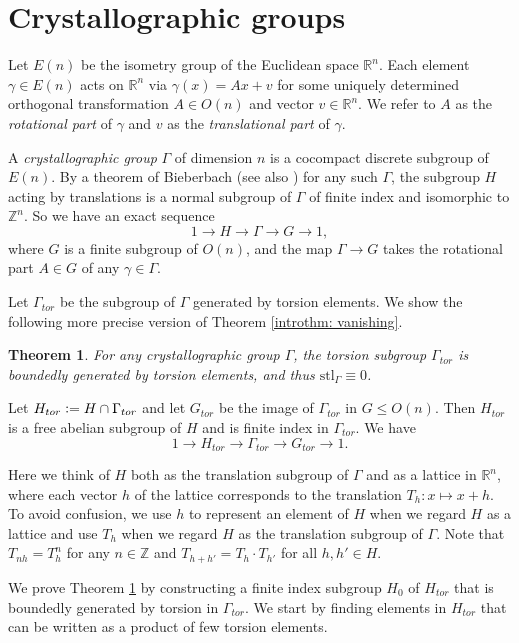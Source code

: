 \documentclass{amsart}
\newtheorem{theorem}{Theorem}[section]
\theoremstyle{definition}
\numberwithin{equation}{section}
\theoremstyle{theorem}
\theoremstyle{remark}
\def\Z{\mathbb Z}
\def\R{\mathbb R}
\def\stl{\mathrm{stl}}
\def\Gt{G_{tor}}
\def\Ht{H_{tor}}
\def\Gat{\Gamma_{tor}}
\def\defeq{\vcentcolon=}
\begin{document}
	\section{Crystallographic groups}\label{sec: crystallographic}
	Let $E(n)$ be the isometry group of the Euclidean space $\R^n$. 
	Each element $\gamma\in E(n)$ acts on $\R^n$ via $\gamma(x)=Ax+v$ for some uniquely determined orthogonal transformation $A\in O(n)$ and vector $v\in\R^n$. 
	We refer to $A$ as the \emph{rotational part} of $\gamma$ and $v$ as the \emph{translational part} of $\gamma$.
	
	A \emph{crystallographic group} $\Gamma$ of dimension $n$ is a cocompact discrete subgroup of $E(n)$. 
	By a theorem of Bieberbach \cite{Bieberbach1912} (see also \cite{Crystbook})
	for any such $\Gamma$, the subgroup $H$ acting by translations is a normal subgroup of $\Gamma$ of finite index and isomorphic to $\Z^n$.
	So we have an exact sequence
	$$1\longrightarrow H \longrightarrow \Gamma \longrightarrow G \longrightarrow 1,$$
	where $G$ is a finite subgroup of $O(n)$, and the map $\Gamma\to G$ takes the rotational part $A\in G$ of any $\gamma\in\Gamma$.
	
	Let $\Gat$ be the subgroup of $\Gamma$ generated by torsion elements.
	We show the following more precise version of Theorem \ref{introthm: vanishing}.
	\begin{theorem}\label{thm: vanishing}
		For any crystallographic group $\Gamma$, the torsion subgroup $\Gat$ is boundedly generated by torsion elements, and thus $\stl_\Gamma\equiv0$.
	\end{theorem}
	
	Let $\Ht\defeq H\cap \Gat$ and let $\Gt$ be the image of $\Gat$ in $G\le O(n)$. Then $\Ht$ is a free abelian subgroup of $H$ and is finite index in $\Gat$. We have
	$$1\longrightarrow \Ht \longrightarrow \Gat \longrightarrow \Gt \longrightarrow 1.$$
	
	Here we think of $H$ both as the translation subgroup of $\Gamma$ and as a lattice in $\R^n$, where each vector $h$ of the lattice corresponds to the translation $T_h:x\mapsto x+h$. To avoid confusion, we use $h$ to represent an element of $H$ when we regard $H$ as a lattice and use $T_h$ when we regard $H$ as the translation subgroup of $\Gamma$. Note that $T_{nh}=T_h^n$ for any $n\in\Z$ and $T_{h+h'}=T_h\cdot T_{h'}$ for all $h,h'\in H$.
	
	We prove Theorem \ref{thm: vanishing} by constructing a finite index subgroup $H_0$ of $\Ht$ that is boundedly generated by torsion in $\Gat$.
	We start by finding elements in $\Ht$ that can be written as a product of few torsion elements.
	
\end{document}
